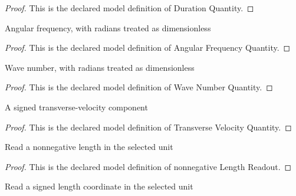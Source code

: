 \begin{proof}
  This is the declared model definition of Duration Quantity.
\end{proof}
\begin{definition}
  \label{def:physics:phyx-mini-0290:phyxminiproblems-problemphyxmini0290-angularfrequencyquantity}
  Angular frequency, with radians treated as dimensionless
\end{definition}
\begin{proof}
  This is the declared model definition of Angular Frequency Quantity.
\end{proof}
\begin{definition}
  \label{def:physics:phyx-mini-0290:phyxminiproblems-problemphyxmini0290-wavenumberquantity}
  Wave number, with radians treated as dimensionless
\end{definition}
\begin{proof}
  This is the declared model definition of Wave Number Quantity.
\end{proof}
\begin{definition}
  \label{def:physics:phyx-mini-0290:phyxminiproblems-problemphyxmini0290-transversevelocityquantity}
  A signed transverse-velocity component
\end{definition}
\begin{proof}
  This is the declared model definition of Transverse Velocity Quantity.
\end{proof}
\begin{definition}
  \label{def:physics:phyx-mini-0290:phyxminiproblems-problemphyxmini0290-nonnegativelengthreadout}
  Read a nonnegative length in the selected unit
\end{definition}
\begin{proof}
  This is the declared model definition of nonnegative Length Readout.
\end{proof}
\begin{definition}
  \label{def:physics:phyx-mini-0290:phyxminiproblems-problemphyxmini0290-signedlengthreadout}
  Read a signed length coordinate in the selected unit
\end{definition}
